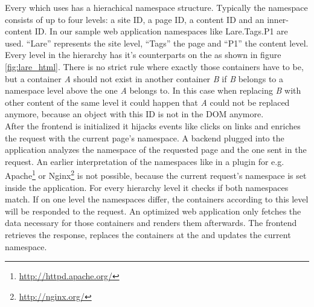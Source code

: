 Every \singlePageApplication{} which uses \lare{} has a hierachical namespace structure.
Typically the namespace consists of up to four levels: a site ID, a page ID, a content ID and an inner-content ID.
In our sample web application namespaces like Lare.Tags.P1 are used.
\enquote{Lare} represents the site level, \enquote{Tags} the page and \enquote{P1} the content level.
Every level in the hierarchy has it's counterparts on the \webSite{} as shown in figure \ref{fig:lare_html}.
There is no strict rule where exactly those containers have to be, but a container \emph{A} should not exist in another container \emph{B} if \emph{B} belongs to a namespace level above the one \emph{A} belongs to.
In this case when replacing \emph{B} with other content of the same level it could happen that \emph{A} could not be replaced anymore, because an object with this ID is not in the DOM anymore.
\\
After the \lare{} frontend is initialized it hijacks events like clicks on links and enriches the request with the current page's namespace.
A \lare{} backend plugged into the application analyzes the namespace of the requested page and the one sent in the request.
An earlier interpretation of the \lare{} namespaces like in a \webServer{} plugin for e.g. Apache\footnote{\url{http://httpd.apache.org/}} or Nginx\footnote{\url{http://nginx.org/}} is not possible, because the current request's namespace is set inside the application.
For every hierarchy level it checks if both namespaces match.
If on one level the namespaces differ, the containers according to this level will be responded to the request.
An optimized web application only fetches the data necessary for those containers and renders them afterwards.
The \lare{} frontend retrieves the response, replaces the containers at the \webSite{} and updates the current namespace.

